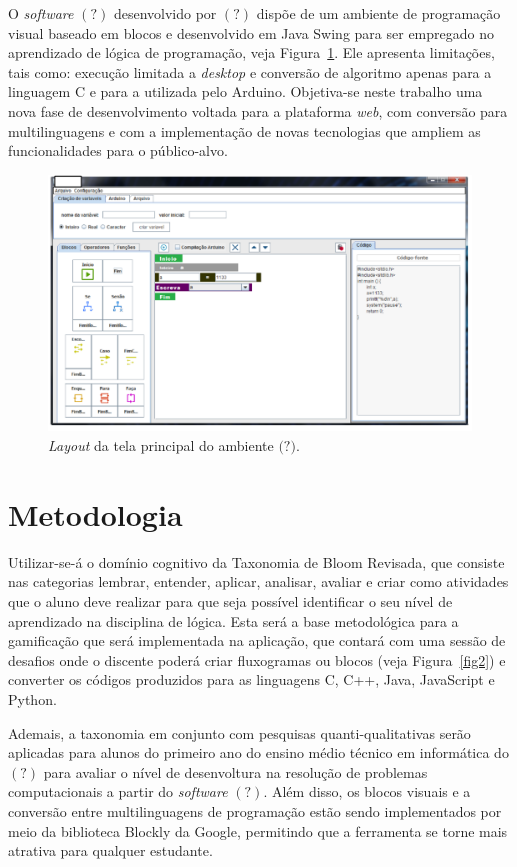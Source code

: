 \documentclass[12pt]{article}
\begin{document}
\par O \textit{software} $(?)$ desenvolvido por $(?)$ dispõe de um ambiente de programação visual baseado em blocos e desenvolvido em Java Swing para ser empregado no aprendizado de lógica de programação, veja Figura~\ref{fig1}. Ele apresenta limitações, tais como: execução limitada a \textit{desktop} e conversão de algoritmo apenas para a linguagem C e para a utilizada pelo Arduino. Objetiva-se neste trabalho uma nova fase de desenvolvimento voltada para a plataforma \textit{web}, com conversão para multilinguagens e com a implementação de novas tecnologias que ampliem as funcionalidades para o público-alvo.
	\begin{figure}[h]
		\centering
		\includegraphics[scale=0.4]{2017.png}
		\caption{\textit{Layout} da tela principal do ambiente $\textbf{(?)}$.}
		\label{fig1}
	\end{figure}
	
\section{Metodologia} 
Utilizar-se-á o domínio cognitivo da Taxonomia de Bloom Revisada, que consiste nas categorias lembrar, entender, aplicar, analisar, avaliar e criar \cite{ANDERSON:2001} como atividades que o aluno deve realizar para que seja possível identificar o seu nível de aprendizado na disciplina de lógica. Esta será a base metodológica para a gamificação que será implementada na aplicação, que contará com uma sessão de desafios onde o discente poderá criar fluxogramas ou blocos (veja Figura~\ref{fig2}) e converter os códigos produzidos para as linguagens C, C++, Java, JavaScript e Python.
\par Ademais, a taxonomia em conjunto com pesquisas quanti-qualitativas serão aplicadas para alunos do primeiro ano do ensino médio técnico em informática do $(?)$ para avaliar o nível de desenvoltura na resolução de problemas computacionais a partir do \textit{software} $(?)$.
Além disso, os blocos visuais e a conversão entre multilinguagens de programação estão sendo implementados por meio da biblioteca Blockly da Google, permitindo que a ferramenta se torne mais atrativa para qualquer estudante.  
\end{document}
